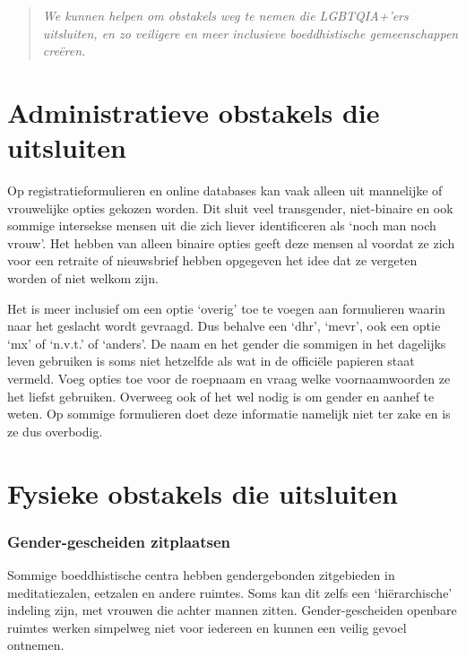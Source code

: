 \documentclass[12pt,openany]{book}
\begin{document}
\begin{quote}
\textit{We kunnen helpen om obstakels weg te nemen die \mbox{LGBTQIA+’ers} uitsluiten, en zo veiligere en meer inclusieve boeddhistische gemeenschappen creëren.}
\end{quote}

\section*{Administratieve obstakels die uitsluiten}

Op registratieformulieren en online databases kan vaak alleen uit mannelijke of vrouwelijke opties gekozen worden.  Dit sluit veel transgender, niet-binaire en ook sommige intersekse mensen uit die zich liever identificeren als ‘noch man noch vrouw’. Het hebben van alleen binaire opties geeft deze mensen al voordat ze zich voor een retraite of nieuwsbrief hebben opgegeven het idee dat ze vergeten worden of niet welkom zijn.

Het is meer inclusief om een optie ‘overig’ toe te voegen aan formulieren waarin naar het geslacht wordt gevraagd. Dus behalve een ‘dhr’, ‘mevr’, ook een optie ‘mx’ of ‘n.v.t.’ of ‘anders’. De naam en het gender die sommigen in het dagelijks leven gebruiken is soms niet hetzelfde als wat in de officiële papieren staat vermeld. Voeg opties toe voor de roepnaam en vraag welke voornaamwoorden ze het liefst gebruiken. Overweeg ook of het wel nodig is om gender en aanhef te weten. Op sommige formulieren doet deze informatie namelijk niet ter zake en is ze dus overbodig.

\section*{Fysieke obstakels die uitsluiten}

\subsubsection*{Gender-gescheiden zitplaatsen}

Sommige boeddhistische centra hebben gendergebonden zitgebieden in meditatiezalen, eetzalen en andere ruimtes. Soms kan dit zelfs een ‘hiërarchische’ indeling zijn, met vrouwen die achter mannen zitten. Gender-gescheiden openbare ruimtes werken simpelweg niet voor iedereen en kunnen een veilig gevoel ontnemen. 
\end{document}
